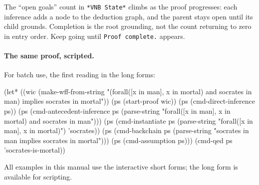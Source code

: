 \begin{remark}
The ``open goals'' count in \texttt{*VNB State*} climbs as the proof
progresses: each inference adds a node to the deduction graph, and
the parent stays open until its child grounds.  Completion is the
root grounding, not the count returning to zero in entry order.
Keep going until \texttt{Proof complete.} appears.
\end{remark}

\paragraph{The same proof, scripted.}
For batch use, the first reading in the long forms:
\begin{VNBsnip}
(let* ((wic (make-wff-from-string
              "(forall([x in man], x in mortal) and socrates in man)
                 implies socrates in mortal"))
       (ps  (start-proof wic))
       (ps  (cmd-direct-inference ps))
       (ps  (cmd-antecedent-inference ps
              (parse-string
                "forall([x in man], x in mortal) and socrates in man")))
       (ps  (cmd-instantiate ps
              (parse-string "forall([x in man], x in mortal)")
              'socrates))
       (ps  (cmd-backchain ps
              (parse-string
                "socrates in man implies socrates in mortal")))
       (ps  (cmd-assumption ps)))
  (cmd-qed ps 'socrates-is-mortal))
\end{VNBsnip}
All examples in this manual use the interactive short forms; the long
form is available for scripting.

